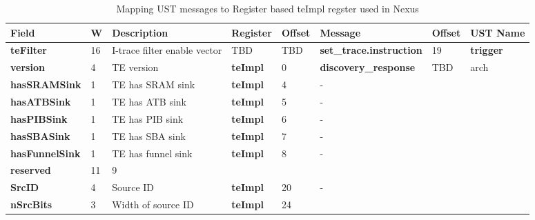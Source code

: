 \begin{table}[htp]
  \tiny
  \centering
  \caption{Mapping UST messages to Register based teImpl regster used in Nexus}
  \label{tab:te_control}
  \begin{tabulary}{\textwidth}{|l|l|p{15mm}|l|p{10mm}|l|p{15mm}|p{15mm}}
    \hline
    {\bf Field} & {\bf W} & {\bf Description} & {\bf Register} & {\bf Offset} & {\bf Message} & {\bf Offset} & {\bf UST Name} \\
    \hline
    \textbf{teFilter} & 16 & I-trace filter enable vector & TBD & TBD & \textbf{set\_trace.instruction} & 19 & \textbf{trigger} \\
    \hline
    \textbf{version} & 4 & TE version & \textbf{teImpl} & 0 & \textbf{discovery\_response} & TBD & arch \\
    \hline
    \textbf{hasSRAMSink} & 1 & TE has SRAM sink & \textbf{teImpl} & 4 & - & \\
    \hline
    \textbf{hasATBSink} & 1 & TE has ATB sink & \textbf{teImpl} & 5 & - &\\
    \hline
    \textbf{hasPIBSink} & 1 & TE has PIB sink & \textbf{teImpl} & 6 & - &\\
    \hline
    \textbf{hasSBASink} & 1 & TE has SBA sink & \textbf{teImpl} & 7 & - & &\\
    \hline
    \textbf{hasFunnelSink} & 1 & TE has funnel sink & \textbf{teImpl} & 8 & - &\\
    \hline
    \textbf{reserved} & 11 & 9 & & & & &\\
    \hline
    \textbf{SrcID} & 4 & Source ID & \textbf{teImpl} & 20 & - &\\
    \hline
    \textbf{nSrcBits} & 3 & Width of source ID & \textbf{teImpl} & 24 & & &\\
    \hline
  \end{tabulary}
\end{table}

